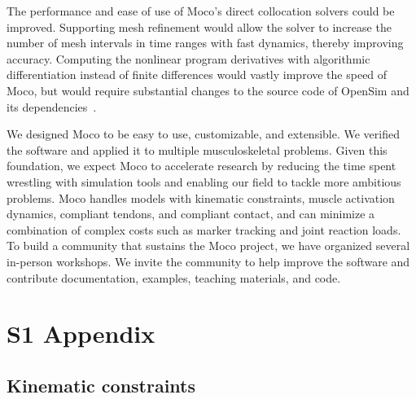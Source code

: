 \documentclass[10pt,letterpaper]{article}
\begin{document}
The performance and ease of use of Moco's direct collocation solvers could be improved. Supporting mesh refinement would allow the solver to increase the number of mesh intervals in time ranges with fast dynamics, thereby improving accuracy. Computing the nonlinear program derivatives with algorithmic differentiation instead of finite differences would vastly improve the speed of Moco, but would require substantial changes to the source code of OpenSim and its dependencies~\cite{Falisse:2019a}.

We designed Moco to be easy to use, customizable, and extensible. We verified the software and applied it to multiple musculoskeletal problems. Given this foundation, we expect Moco to accelerate research by reducing the time spent wrestling with simulation tools and enabling our field to tackle more ambitious problems. Moco handles models with kinematic constraints, muscle activation dynamics, compliant tendons, and compliant contact, and can minimize a combination of complex costs such as marker tracking and joint reaction loads. To build a community that sustains the Moco project, we have organized several in-person workshops. We invite the community to help improve the software and contribute documentation, examples, teaching materials, and code.

\section*{S1 Appendix}

\subsection*{Kinematic constraints}
\end{document}
